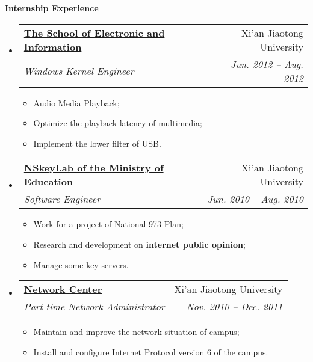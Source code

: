 \documentclass[letterpaper,11pt]{article}
\makeatletter
\newcommand{\resitem}[1]{\item #1 \vspace{-2pt}}
\newcommand{\resheading}[1]{{\large \colorbox{mygrey}{\begin{minipage}{\textwidth}{\textbf{#1 \vphantom{p\^{E}}}}\end{minipage}}}}
\newcommand{\ressubheading}[4]{
\begin{tabular*}{6.5in}{l@{\extracolsep{\fill}}r}
		\textbf{#1} & #2 \\
		\textit{#3} & \textit{#4} \\
\end{tabular*}\vspace{-6pt}}
\makeatother
\begin{document}
\resheading{Internship Experience}
	\begin{itemize}
		\item 
			\ressubheading{\href{http://eie.xjtu.edu.cn/}{The School of Electronic and Information}}{Xi'an Jiaotong University}{Windows Kernel Engineer}{Jun. 2012 -- Aug. 2012}
				{ \footnotesize
				\begin{itemize}
					\resitem{Audio Media Playback;}
					\resitem{Optimize the playback latency of multimedia;}
					\resitem{Implement the lower filter of USB.}
				\end{itemize}
				}
		\item 
			\ressubheading{\href{http://nskeylab.xjtu.edu.cn/}{NSkeyLab of the Ministry of Education}}{Xi'an Jiaotong University}{Software Engineer}{Jun. 2010 -- Aug. 2010}
				{ \footnotesize
				\begin{itemize}
					\resitem{Work for a project of National 973 Plan;}
					\resitem{Research and development on \textbf{internet public opinion};}
					\resitem{Manage some key servers.}
				\end{itemize}
				}
		\item
			\ressubheading{\href{http://nic.xjtu.edu.cn}{Network Center}}{Xi'an Jiaotong University}{Part-time Network Administrator}{Nov. 2010 -- Dec. 2011}
				{ \footnotesize
				\begin{itemize}
					\resitem{Maintain and improve the network situation of campus;}
					\resitem{Install and configure Internet Protocol version 6 of the campus.}
				\end{itemize}
          		}
	\end{itemize}
\end{document}

